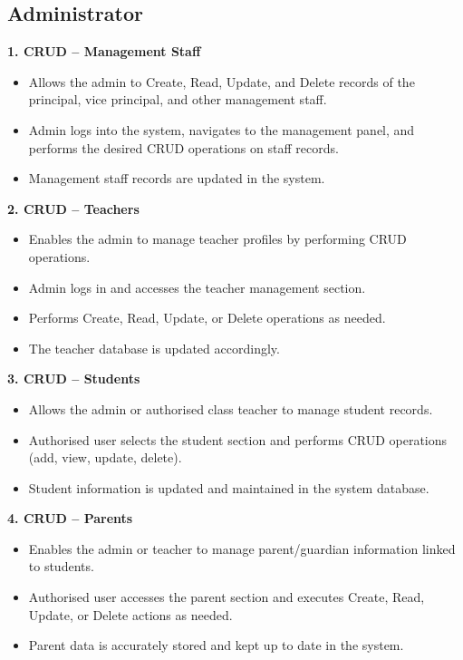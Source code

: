 \documentclass[12pt, a4paper]{report}
\begin{document}
\subsection{Administrator}

\textbf{1. CRUD -- Management Staff}
\begin{itemize}
    \item Allows the admin to Create, Read, Update, and Delete records of the principal, vice principal, and other management staff.
    \item Admin logs into the system, navigates to the management panel, and performs the desired CRUD operations on staff records.
    \item Management staff records are updated in the system.
\end{itemize}

\textbf{2. CRUD -- Teachers}
\begin{itemize}
    \item Enables the admin to manage teacher profiles by performing CRUD operations.
    \item Admin logs in and accesses the teacher management section.
    \item Performs Create, Read, Update, or Delete operations as needed.
    \item The teacher database is updated accordingly.
\end{itemize}

\textbf{3. CRUD -- Students}
\begin{itemize}
    \item Allows the admin or authorised class teacher to manage student records.
    \item Authorised user selects the student section and performs CRUD operations (add, view, update, delete).
    \item Student information is updated and maintained in the system database.
\end{itemize}

\textbf{4. CRUD -- Parents}
\begin{itemize}
    \item Enables the admin or teacher to manage parent/guardian information linked to students.
    \item Authorised user accesses the parent section and executes Create, Read, Update, or Delete actions as needed.
    \item Parent data is accurately stored and kept up to date in the system.
\end{itemize}
\end{document}
